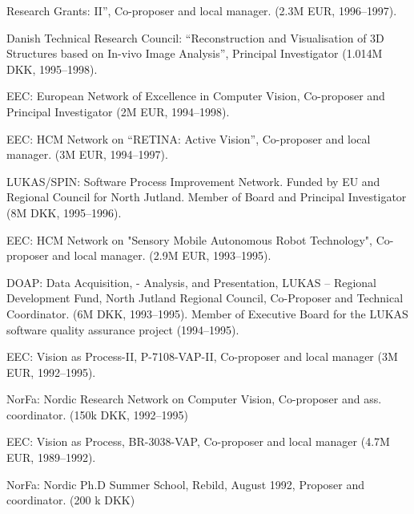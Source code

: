 \documentclass{article}
\begin{document}
\begin{cv}
\begin{cvlist}{Research Grants:}
  II'', Co-proposer and local manager.  (2.3M EUR, 1996--1997).%
\item Danish Technical Research Council: ``Reconstruction and
  Visualisation of 3D Structures based on In-vivo Image Analysis'',
  Principal Investigator (1.014M DKK, 1995--1998).%
\item EEC: European Network of Excellence in Computer Vision,
  Co-proposer and Principal Investigator (2M EUR, 1994--1998).%
\item EEC: HCM Network on ``RETINA: Active Vision'', Co-proposer and
  local manager.  (3M EUR, 1994--1997).%
\item LUKAS/SPIN: Software Process Improvement Network. Funded by EU
  and Regional Council for North Jutland. Member of Board and
  Principal Investigator (8M DKK, 1995--1996).%
\item EEC: HCM Network on "Sensory Mobile Autonomous Robot
  Technology", Co-proposer and local manager.  (2.9M EUR,
  1993--1995).%
\item DOAP: Data Acquisition, - Analysis, and Presentation, LUKAS --
  Regional Development Fund, North Jutland Regional Council,
  Co-Proposer and Technical Coordinator. (6M DKK, 1993--1995). Member
  of  Executive Board for the LUKAS software quality assurance project
  (1994--1995).%
\item EEC: Vision as Process-II, P-7108-VAP-II, Co-proposer and local
  manager (3M EUR, 1992--1995).%
\item NorFa: Nordic Research Network on Computer Vision, Co-proposer
  and ass. coordinator.  (150k DKK, 1992--1995)%
\item EEC: Vision as Process, BR-3038-VAP, Co-proposer and local
  manager (4.7M EUR, 1989--1992).%
\item NorFa: Nordic Ph.D Summer School, Rebild, August 1992, Proposer
  and coordinator. (200 k DKK)%
\end{cvlist}


\end{cv}
\end{document}
